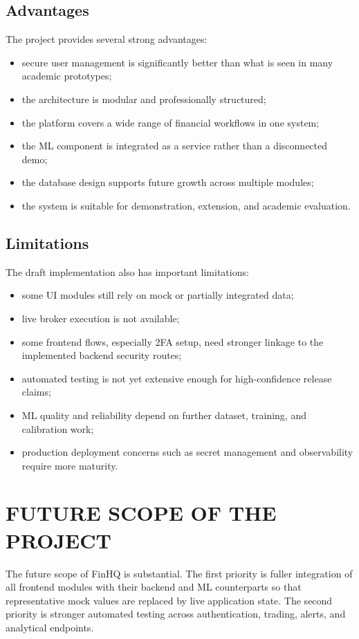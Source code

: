 \documentclass[12pt,a4paper]{report}
\newcommand{\projectshort}{FinHQ}
\begin{document}
\subsection{Advantages}
The project provides several strong advantages:
\begin{itemize}
\item secure user management is significantly better than what is seen in many academic prototypes;
\item the architecture is modular and professionally structured;
\item the platform covers a wide range of financial workflows in one system;
\item the ML component is integrated as a service rather than a disconnected demo;
\item the database design supports future growth across multiple modules;
\item the system is suitable for demonstration, extension, and academic evaluation.
\end{itemize}

\subsection{Limitations}
The draft implementation also has important limitations:
\begin{itemize}
\item some UI modules still rely on mock or partially integrated data;
\item live broker execution is not available;
\item some frontend flows, especially 2FA setup, need stronger linkage to the implemented backend security routes;
\item automated testing is not yet extensive enough for high-confidence release claims;
\item ML quality and reliability depend on further dataset, training, and calibration work;
\item production deployment concerns such as secret management and observability require more maturity.
\end{itemize}

\section{FUTURE SCOPE OF THE PROJECT}
The future scope of \projectshort{} is substantial. The first priority is fuller integration of all frontend modules with their backend and ML counterparts so that representative mock values are replaced by live application state. The second priority is stronger automated testing across authentication, trading, alerts, and analytical endpoints.
\end{document}
